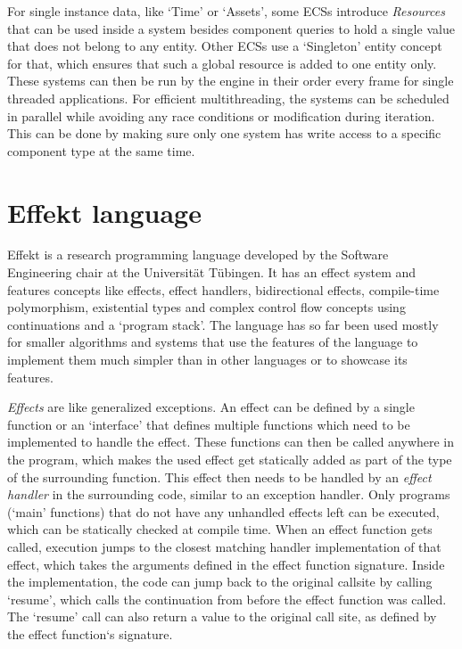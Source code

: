 For single instance data, like `Time' or `Assets', some ECSs introduce \textit{Resources} that can be used inside a system besides component queries to hold a single value that does not belong to any entity. Other ECSs use a `Singleton' entity concept for that, which ensures that such a global resource is added to one entity only. These systems can then be run by the engine in their order every frame for single threaded applications. For efficient multithreading, the systems can be scheduled in parallel while avoiding any race conditions or modification during iteration. This can be done by making sure only one system has write access to a specific component type at the same time.

\section{Effekt language}

Effekt is a research programming language developed by the Software Engineering chair at the Universität Tübingen. It has an effect system and features concepts like effects, effect handlers, bidirectional effects, compile-time polymorphism, existential types and complex control flow concepts using continuations and a `program stack'. The language has so far been used mostly for smaller algorithms and systems that use the features of the language to implement them much simpler than in other languages or to showcase its features.

\textit{Effects} are like generalized exceptions. An effect can be defined by a single function or an `interface' that defines multiple functions which need to be implemented to handle the effect. These functions can then be called anywhere in the program, which makes the used effect get statically added as part of the type of the surrounding function. This effect then needs to be handled by an \textit{effect handler} in the surrounding code, similar to an exception handler. Only programs (`main' functions) that do not have any unhandled effects left can be executed, which can be statically checked at compile time. When an effect function gets called, execution jumps to the closest matching handler implementation of that effect, which takes the arguments defined in the effect function signature. Inside the implementation, the code can jump back to the original callsite by calling `resume', which calls the continuation from before the effect function was called. The `resume' call can also return a value to the original call site, as defined by the effect function`s signature.

